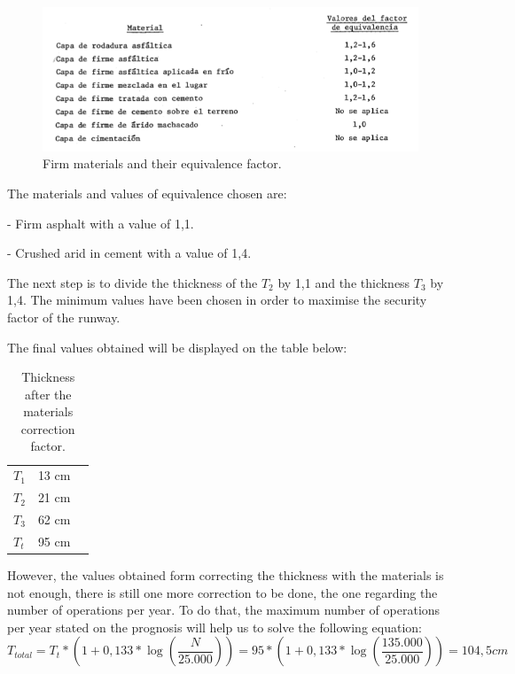 		\begin{figure}[H]
			\centering
			\includegraphics[clip, trim=0cm 0cm 0cm 0cm, width=1\textwidth]{./images/pavement/firmes}
			\caption{Firm materials and their equivalence factor.}
			\label{} %
		\end{figure}
		
		The materials and values of equivalence chosen are:
		
		- Firm asphalt with a value of 1,1.
		
		- Crushed arid in cement with a value of 1,4.
		
		The next step is to divide the thickness of the \(T_2\) by 1,1 and the thickness \(T_3\) by 1,4. The minimum values have been chosen in order to maximise the security factor of the runway. 
		
		The final values obtained will be displayed on the table below:
		
		\begin{table}[htb]
			\centering
			\begin{tabular}{ll p{5cm}}
				\midrule[2pt]
				\(T_1\)& 13 cm\\
				\(T_2\) & 21 cm\\
				\(T_3\)& 62 cm \\
				\(T_t\)& 95 cm\\
				\bottomrule[2pt]
			\end{tabular}
			\caption{Thickness after the materials correction factor.}
			\label{}
		\end{table}
		
		However, the values obtained form correcting the thickness with the materials is not enough, there is still one more correction to be done, the one regarding the number of operations per year. To do that, the maximum number of operations per year stated on the prognosis will help us to solve the following equation:
		\[T_{total} = T_t * (1+0,133*\log(\dfrac{N}{25.000})) = 95 * (1+0,133*\log(\dfrac{135.000}{25.000}))= 104,5cm\]
		
